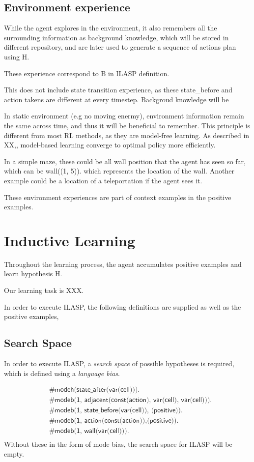 \subsection{Environment experience}

While the agent explores in the environment, it also remembers all the surrounding information as background knowledge, 
which will be stored in different repository, and are later used to generate a sequence of actions plan using H.

These experience correspond to B in ILASP definition. 

This does not include state transition experience, as these state\_before and action takens are different at every timestep.
Backgroud knowledge will be 

In static environment (e.g no moving enermy), environment information remain the same across time, and thus it will be beneficial to remember. 
This principle is different from most RL methods, as they are model-free learning. 
As described in XX,, model-based learning converge to optimal policy more efficiently. 

In a simple maze, these could be all wall position that the agent has seen so far, which can be 
wall((1, 5)). which represents the location of the wall. 
Another example could be a location of a teleportation if the agent sees it. 

These environment experiences are part of context examples in the positive examples. 

\section{Inductive Learning}
\label{induction}
Throughout the learning process, the agent accumulates positive examples and learn hypothesis H. 

Our learning task is XXX.

In order to execute ILASP, the following definitions are supplied as well as the positive examples,

\subsection{Search Space}
In order to execute ILASP, a \textit{search space} of possible hypotheses is required, which is defined using a \textit{language bias}. 

\begin{equation}
\begin{split}    
&\textsf{\#modeh(state\_after(var(cell))).}\\
&\textsf{\#modeb(1, adjacent(const(action), var(cell), var(cell))).} \\
&\textsf{\#modeb(1, state\_before(var(cell)), (positive)).} \\
&\textsf{\#modeb(1, action(const(action)),(positive)).} \\
&\textsf{\#modeb(1, wall(var(cell))).} \\
\end{split}
\end{equation}
Without these in the form of mode bias, the search space for ILASP will be empty. 


